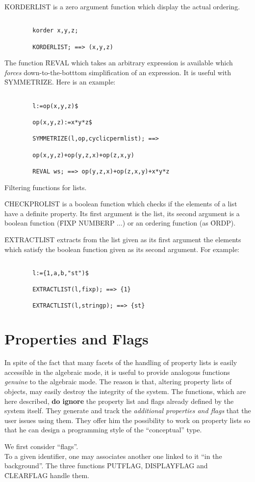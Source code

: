 \f{KORDERLIST} is a zero argument function which display the actual
ordering.
\begin{verbatim}

        korder x,y,z;

        KORDERLIST; ==> (x,y,z)

\end{verbatim}
\item[iv.] The function \f{REVAL} which takes an arbitrary expression
is available which {\em forces} down-to-the-botttom simplification of
an expression. It is useful with \f{SYMMETRIZE}.\nl
Here is an example:
\begin{verbatim}

        l:=op(x,y,z)$

        op(x,y,z):=x*y*z$

        SYMMETRIZE(l,op,cyclicpermlist); ==>

        op(x,y,z)+op(y,z,x)+op(z,x,y)

        REVAL ws; ==> op(y,z,x)+op(z,x,y)+x*y*z

\end{verbatim}
\item[v.] Filtering functions for lists.

\f{CHECKPROLIST}  is a  boolean function which checks if the
elements of a list have a definite property. Its first argument
is the list, its second argument is a boolean function
(\f{FIXP NUMBERP $\ldots$}) or an ordering function (as \f{ORDP}).

\f{EXTRACTLIST} extracts from the list given as its first argument
the elements which satisfy the boolean function given as its second
argument. For example:
\begin{verbatim}

        l:={1,a,b,"st")$

        EXTRACTLIST(l,fixp); ==> {1}

        EXTRACTLIST(l,stringp); ==> {st}

\end{verbatim}
\ei
\section{Properties and Flags}
In spite of the fact that many facets of the handling of
property lists is easily accessible in the algebraic mode, it is useful to
provide analogous functions {\em genuine} to the algebraic mode. The reason is
that, altering property lists of objects, may easily destroy the integrity
of the system. The functions, which are here described, {\bf do ignore}
the property list and flags already defined by the system itself. They
generate and track the {\em additional properties and flags} that the user
issues using them. They offer him
the  possibility to work on property lists so
that he can design a programming style of the ``conceptual'' type.
\bi
\item[i.] We first consider ``flags''. \\
To a given identifier, one may
associates another one linked to it ``in the background''. The  three
functions \f{PUTFLAG, DISPLAYFLAG} and \f{CLEARFLAG} handle them.

